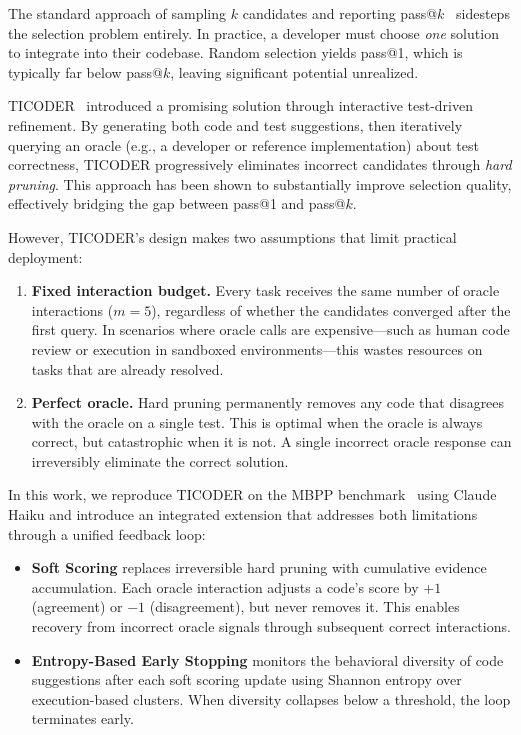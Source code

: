\documentclass[conference]{IEEEtran}
\begin{document}
The standard approach of sampling $k$ candidates and reporting pass@$k$~\cite{chen2021codex} sidesteps the selection problem entirely. In practice, a developer must choose \emph{one} solution to integrate into their codebase. Random selection yields pass@1, which is typically far below pass@$k$, leaving significant potential unrealized.

TICODER~\cite{ticoder} introduced a promising solution through interactive test-driven refinement. By generating both code and test suggestions, then iteratively querying an oracle (e.g., a developer or reference implementation) about test correctness, TICODER progressively eliminates incorrect candidates through \emph{hard pruning}. This approach has been shown to substantially improve selection quality, effectively bridging the gap between pass@1 and pass@$k$.

However, TICODER's design makes two assumptions that limit practical deployment:

\begin{enumerate}
    \item \textbf{Fixed interaction budget.} Every task receives the same number of oracle interactions ($m=5$), regardless of whether the candidates converged after the first query. In scenarios where oracle calls are expensive---such as human code review or execution in sandboxed environments---this wastes resources on tasks that are already resolved.
    \item \textbf{Perfect oracle.} Hard pruning permanently removes any code that disagrees with the oracle on a single test. This is optimal when the oracle is always correct, but catastrophic when it is not. A single incorrect oracle response can irreversibly eliminate the correct solution.
\end{enumerate}

In this work, we reproduce TICODER on the MBPP benchmark~\cite{austin2021mbpp} using Claude Haiku and introduce an integrated extension that addresses both limitations through a unified feedback loop:

\begin{itemize}
    \item \textbf{Soft Scoring} replaces irreversible hard pruning with cumulative evidence accumulation. Each oracle interaction adjusts a code's score by $+1$ (agreement) or $-1$ (disagreement), but never removes it. This enables recovery from incorrect oracle signals through subsequent correct interactions.
    \item \textbf{Entropy-Based Early Stopping} monitors the behavioral diversity of code suggestions after each soft scoring update using Shannon entropy over execution-based clusters. When diversity collapses below a threshold, the loop terminates early.
\end{itemize}
\end{document}
